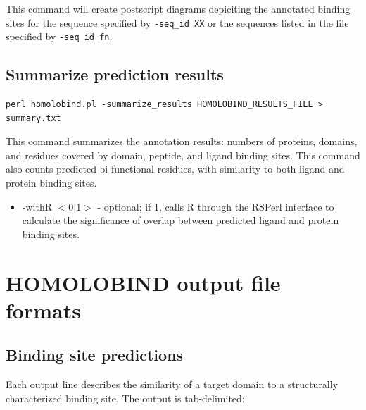 \documentclass[11pt]{article}
\begin{document}
This command will create postscript diagrams depiciting the annotated binding sites for the sequence specified by {\tt -seq\_id XX} or the sequences listed in the file specified by {\tt -seq\_id\_fn}.

\subsection{Summarize prediction results}

\lstset{breaklines=true,language=bash,breakatwhitespace=true}
\lstset{frame=single}
\lstset{basicstyle=\ttfamily}
\begin{lstlisting}
perl homolobind.pl -summarize_results HOMOLOBIND_RESULTS_FILE > summary.txt
\end{lstlisting}

This command summarizes the annotation results: numbers of proteins, domains, and residues covered by domain, peptide, and ligand binding sites. This command also counts predicted bi-functional residues, with similarity to both ligand and protein binding sites.\\

\begin{itemize}
\item -withR $<$0$|$1$>$ - optional; if 1, calls R through the RSPerl interface to calculate the significance of overlap between predicted ligand and protein binding sites.
\end{itemize}

\section{HOMOLOBIND output file formats}
\subsection{Binding site predictions}

Each output line describes the similarity of a target domain to a structurally characterized binding site. The output is tab-delimited:
\end{document}
